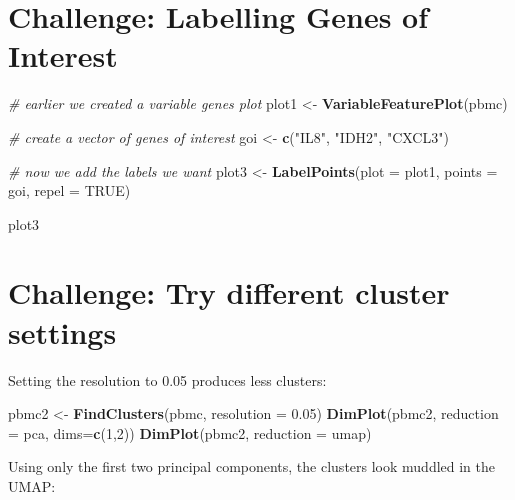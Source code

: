 \documentclass[
]{book}
\newenvironment{Shaded}{\begin{snugshade}}{\end{snugshade}}
\newcommand{\AttributeTok}[1]{\textcolor[rgb]{0.13,0.29,0.53}{#1}}
\newcommand{\CommentTok}[1]{\textcolor[rgb]{0.56,0.35,0.01}{\textit{#1}}}
\newcommand{\ConstantTok}[1]{\textcolor[rgb]{0.56,0.35,0.01}{#1}}
\newcommand{\DecValTok}[1]{\textcolor[rgb]{0.00,0.00,0.81}{#1}}
\newcommand{\FloatTok}[1]{\textcolor[rgb]{0.00,0.00,0.81}{#1}}
\newcommand{\FunctionTok}[1]{\textcolor[rgb]{0.13,0.29,0.53}{\textbf{#1}}}
\newcommand{\NormalTok}[1]{#1}
\newcommand{\OtherTok}[1]{\textcolor[rgb]{0.56,0.35,0.01}{#1}}
\newcommand{\StringTok}[1]{\textcolor[rgb]{0.31,0.60,0.02}{#1}}
\begin{document}
\section{Challenge: Labelling Genes of Interest}\label{challenge-labelling-genes-of-interest}

\begin{Shaded}
\begin{Highlighting}[]
\CommentTok{\# earlier we created a variable genes plot}
\NormalTok{plot1 }\OtherTok{\textless{}{-}} \FunctionTok{VariableFeaturePlot}\NormalTok{(pbmc)}

\CommentTok{\# create a vector of genes of interest}
\NormalTok{goi }\OtherTok{\textless{}{-}} \FunctionTok{c}\NormalTok{(}\StringTok{"IL8"}\NormalTok{, }\StringTok{"IDH2"}\NormalTok{, }\StringTok{"CXCL3"}\NormalTok{)}

\CommentTok{\# now we add the labels we want}
\NormalTok{plot3 }\OtherTok{\textless{}{-}} \FunctionTok{LabelPoints}\NormalTok{(}\AttributeTok{plot =}\NormalTok{ plot1, }\AttributeTok{points =}\NormalTok{ goi, }\AttributeTok{repel =} \ConstantTok{TRUE}\NormalTok{)}

\NormalTok{plot3}
\end{Highlighting}
\end{Shaded}

\section{Challenge: Try different cluster settings}\label{challenge-try-different-cluster-settings-1}

Setting the resolution to 0.05 produces less clusters:

\begin{Shaded}
\begin{Highlighting}[]
\NormalTok{pbmc2 }\OtherTok{\textless{}{-}} \FunctionTok{FindClusters}\NormalTok{(pbmc, }\AttributeTok{resolution =} \FloatTok{0.05}\NormalTok{)}
\FunctionTok{DimPlot}\NormalTok{(pbmc2, }\AttributeTok{reduction =} \StringTok{\textquotesingle{}pca\textquotesingle{}}\NormalTok{, }\AttributeTok{dims=}\FunctionTok{c}\NormalTok{(}\DecValTok{1}\NormalTok{,}\DecValTok{2}\NormalTok{))}
\FunctionTok{DimPlot}\NormalTok{(pbmc2, }\AttributeTok{reduction =} \StringTok{\textquotesingle{}umap\textquotesingle{}}\NormalTok{)}
\end{Highlighting}
\end{Shaded}

Using only the first two principal components, the clusters look muddled in the UMAP:
\end{document}
